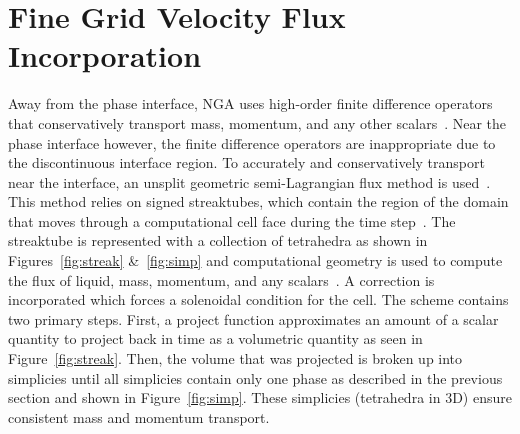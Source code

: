 \section*{Fine Grid Velocity Flux  Incorporation} 
Away from the phase interface, NGA uses high-order finite difference operators that conservatively transport mass, momentum, and any other scalars~\cite{NGA2}.  Near the phase interface however, the finite difference operators are inappropriate due to the discontinuous interface region.  To accurately and conservatively transport near the interface, an unsplit geometric semi-Lagrangian flux method is used~\cite{Owkes2017,Owkes2014}. This method relies on signed streaktubes, which contain the region of the domain that moves through a computational cell face during the time step~\cite{Owkes2017}.  The streaktube is represented with a collection of tetrahedra as shown in Figures~\ref{fig:streak} \&~\ref{fig:simp} and computational geometry is used to compute the flux of liquid, mass, momentum, and any scalars~\cite{Owkes2017}. A correction is incorporated which forces a solenoidal condition for the cell. The scheme contains two primary steps. First, a project function approximates an amount of a scalar quantity to project back in time as a volumetric quantity as seen in Figure~\ref{fig:streak}. Then, the volume that was projected is broken up into simplicies until all simplicies contain only one phase as described in the previous section and shown in Figure~\ref{fig:simp}. These simplicies (tetrahedra in 3D) ensure consistent mass and momentum transport.

